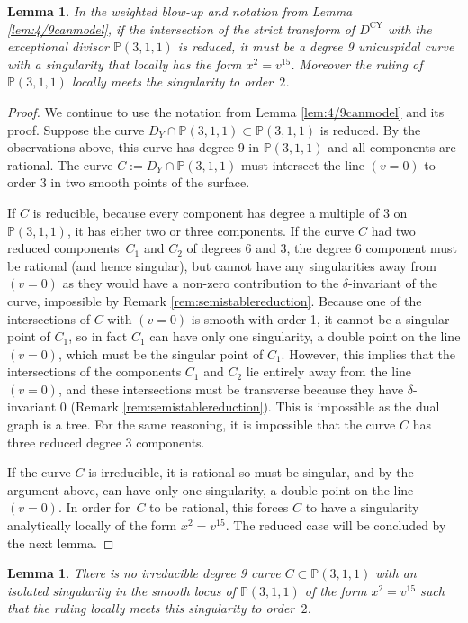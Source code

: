 \documentclass[JEP,XML,SOM,Unicode,NoFloatCountersInSection,published]{cedram}
\theoremstyle{plain}
\newtheorem{lemma}[theorem]{Lemma}
\theoremstyle{definition}
\newcommand\PP{{\mathbb{P}}}
\newcommand\Dcy{{D^{\mathrm{CY}}}}
\begin{document}
\begin{lemma}\label{lem:reducedcasepart1}
In the weighted blow-up and notation from Lemma \ref{lem:4/9canmodel}, if the intersection of the strict transform of $\Dcy$ with the exceptional divisor $\PP(3,1,1)$ is reduced, it must be a degree 9 unicuspidal curve with a singularity that locally has the form $x^2 = v^{15}$. Moreover the ruling of $\PP(3,1,1)$ locally meets the singularity to order~$2$.
\end{lemma}

\begin{proof}
We continue to use the notation from Lemma \ref{lem:4/9canmodel} and its proof. Suppose the curve $D_Y \cap \PP(3,1,1) \subset \PP(3,1,1)$ is reduced. By the observations above, this curve has degree 9 in $\PP(3,1,1)$ and all components are rational. The curve $C := D_Y \cap \PP(3,1,1)$ must intersect the line $(v = 0)$ to order 3 in two smooth points of the surface.

If $C$ is reducible, because every component has degree a multiple of 3 on $\PP(3,1,1)$, it has either two or three components. If the curve $C$ had two reduced components~$C_1$ and $C_2$ of degrees 6 and 3, the degree 6 component must be rational (and hence singular), but cannot have any singularities away from $(v = 0)$ as they would have a non-zero contribution to the $\delta$-invariant of the curve, impossible by Remark \ref{rem:semistablereduction}. Because one of the intersections of $C$ with $(v=0)$ is smooth with order 1, it cannot be a singular point of $C_1$, so in fact $C_1$ can have only one singularity, a double point on the line $(v = 0)$, which must be the singular point of $C_1$. However, this implies that the intersections of the components $C_1$ and $C_2$ lie entirely away from the line $(v=0)$, and these intersections must be transverse because they have $\delta$-invariant 0 (Remark \ref{rem:semistablereduction}). This is impossible as the dual graph is a tree. For the same reasoning, it is impossible that the curve $C$ has three reduced degree 3 components.

If the curve $C$ is irreducible, it is rational so must be singular, and by the argument above, can have only one singularity, a double point on the line $(v = 0)$. In order for~$C$ to be rational, this forces $C$ to have a singularity analytically locally of the form $x^2 = v^{15}$. The reduced case will be concluded by the next lemma.
\end{proof}

\begin{lemma}\label{lem:reducedcasepart2}
There is no irreducible degree 9 curve $C\subset \PP(3,1,1)$ with an isolated singularity in the smooth locus of $\PP(3,1,1)$ of the form $x^2 = v^{15}$ such that the ruling locally meets this singularity to order~$2$.
\end{lemma}
\end{document}

